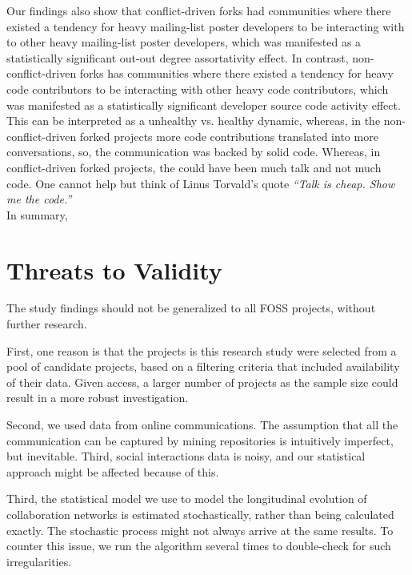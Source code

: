 \documentclass[12pt]{report}
\begin{document}
Our findings also show that conflict-driven forks had communities where there existed a tendency for heavy mailing-list poster developers to be interacting with to other heavy mailing-list poster developers, which was manifested as a statistically significant out-out degree assortativity effect. In contrast, non-conflict-driven forks has communities where there existed a tendency for heavy code contributors to be interacting with other heavy code contributors, which was manifested as a statistically significant developer source code activity effect. This can be interpreted as a unhealthy vs. healthy dynamic, whereas, in the non-conflict-driven forked projects more code contributions translated into more conversations, so, the communication was backed by solid code. Whereas, in conflict-driven forked projects, the could have been much talk and not much code. One cannot help but think of Linus Torvald's quote \textit{``Talk is cheap. Show me the code.''}\\

In summary, 








\pagebreak

\section{Threats to Validity}
\label{threatsToValidity}


The study findings should not be generalized to all FOSS projects, without further research. 

First, one reason is that the projects is this research study were selected from a pool of candidate projects, based on a filtering criteria that included availability of their data. Given access, a larger number of projects as the sample size could result in a more robust investigation. 

Second, we used data from online communications. The assumption that all the communication can be captured by mining repositories is intuitively imperfect, but inevitable. Third, social interactions data is noisy, and our statistical approach might be affected because of this. 

Third, the statistical model we use to model the longitudinal evolution of collaboration networks is estimated stochastically, rather than being calculated exactly. The stochastic process might not always arrive at the same results. To counter this issue, we run the algorithm several times to double-check for such irregularities.
\end{document}

